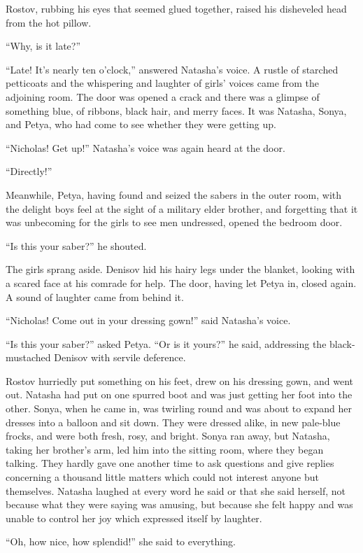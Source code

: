 Rostov, rubbing his eyes that seemed glued together, raised his
disheveled head from the hot pillow.

``Why, is it late?''

``Late! It's nearly ten o'clock,'' answered Natasha's voice. A
rustle of starched petticoats and the whispering and laughter of
girls' voices came from the adjoining room. The door was opened a
crack and there was a glimpse of something blue, of ribbons,
black hair, and merry faces. It was Natasha, Sonya, and Petya,
who had come to see whether they were getting up.

``Nicholas! Get up!'' Natasha's voice was again heard at the
door.

``Directly!''

Meanwhile, Petya, having found and seized the sabers in the outer
room, with the delight boys feel at the sight of a military elder
brother, and forgetting that it was unbecoming for the girls to
see men undressed, opened the bedroom door.

``Is this your saber?'' he shouted.

The girls sprang aside. Denisov hid his hairy legs under the
blanket, looking with a scared face at his comrade for help. The
door, having let Petya in, closed again. A sound of laughter came
from behind it.

``Nicholas! Come out in your dressing gown!'' said Natasha's
voice.

``Is this your saber?'' asked Petya. ``Or is it yours?'' he said,
addressing the black-mustached Denisov with servile deference.

Rostov hurriedly put something on his feet, drew on his dressing
gown, and went out. Natasha had put on one spurred boot and was
just getting her foot into the other. Sonya, when he came in, was
twirling round and was about to expand her dresses into a balloon
and sit down. They were dressed alike, in new pale-blue frocks,
and were both fresh, rosy, and bright. Sonya ran away, but
Natasha, taking her brother's arm, led him into the sitting room,
where they began talking. They hardly gave one another time to
ask questions and give replies concerning a thousand little
matters which could not interest anyone but themselves. Natasha
laughed at every word he said or that she said herself, not
because what they were saying was amusing, but because she felt
happy and was unable to control her joy which expressed itself by
laughter.

``Oh, how nice, how splendid!'' she said to everything.

